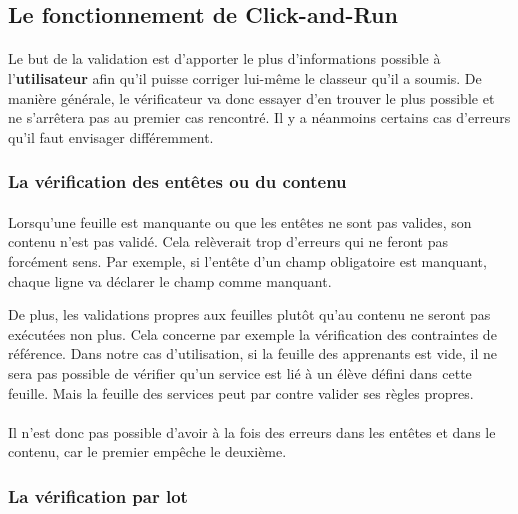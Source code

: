 \subsection{Le fonctionnement de Click-and-Run}
\label{subsec:operation}

\paragraph{}
Le but de la validation est d'apporter le plus d'informations possible à l'\textbf{utilisateur} afin qu'il puisse corriger lui-même le classeur qu'il a soumis.
De manière générale, le vérificateur va donc essayer d'en trouver le plus possible et ne s'arrêtera pas au premier cas rencontré.
Il y a néanmoins certains cas d'erreurs qu'il faut envisager différemment.

\subsubsection{La vérification des entêtes ou du contenu}
\label{subsubsec:headers-validation}

\paragraph{}
Lorsqu'une feuille est manquante ou que les entêtes ne sont pas valides, son contenu n'est pas validé.
Cela relèverait trop d'erreurs qui ne feront pas forcément sens.
Par exemple, si l'entête d'un champ obligatoire est manquant, chaque ligne va déclarer le champ comme manquant.

De plus, les validations propres aux feuilles plutôt qu'au contenu ne seront pas exécutées non plus.
Cela concerne par exemple la vérification des contraintes de référence.
Dans notre cas d'utilisation, si la feuille des apprenants est vide, il ne sera pas possible de vérifier qu'un service est lié à un élève défini dans cette feuille.
Mais la feuille des services peut par contre valider ses règles propres.

\paragraph{}
Il n'est donc pas possible d'avoir à la fois des erreurs dans les entêtes et dans le contenu, car le premier empêche le deuxième.

\subsubsection{La vérification par lot}
\label{subsubsec:batch-validation}

